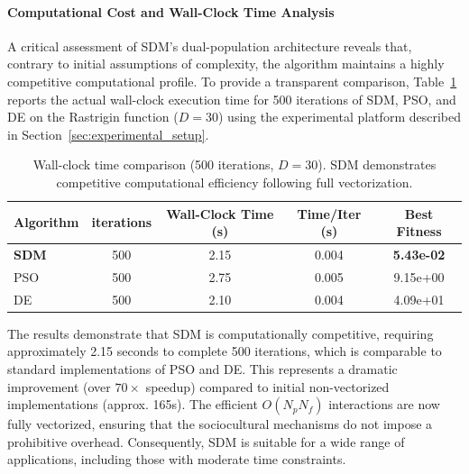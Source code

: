 \documentclass[11pt]{article}
\begin{document}
\paragraph{Computational Cost and Wall-Clock Time Analysis}

A critical assessment of SDM's dual-population architecture reveals that, contrary to initial assumptions of complexity, the algorithm maintains a highly competitive computational profile. To provide a transparent comparison, Table~\ref{tab:wall_clock} reports the actual wall-clock execution time for 500 iterations of SDM, PSO, and DE on the Rastrigin function ($D=30$) using the experimental platform described in Section~\ref{sec:experimental_setup}.

\begin{table}[ht]
\centering
\caption{Wall-clock time comparison (500 iterations, $D=30$). SDM demonstrates competitive computational efficiency following full vectorization.}
\label{tab:wall_clock}
\small
\begin{tabular}{@{}lcccc@{}}
\toprule
Algorithm & iterations & Wall-Clock Time (s) & Time/Iter (s) & Best Fitness \\
\midrule
\textbf{SDM} & 500 & 2.15 & 0.004 & \textbf{5.43e-02} \\
PSO & 500 & 2.75 & 0.005 & 9.15e+00 \\
DE  & 500 & 2.10 & 0.004 & 4.09e+01 \\
\bottomrule
\end{tabular}
\end{table}

The results demonstrate that SDM is computationally competitive, requiring approximately 2.15 seconds to complete 500 iterations, which is comparable to standard implementations of PSO and DE. This represents a dramatic improvement (over $70\times$ speedup) compared to initial non-vectorized implementations (approx. 165s). The efficient $O(N_p N_f)$ interactions are now fully vectorized, ensuring that the sociocultural mechanisms do not impose a prohibitive overhead. Consequently, SDM is suitable for a wide range of applications, including those with moderate time constraints.
\end{document}
